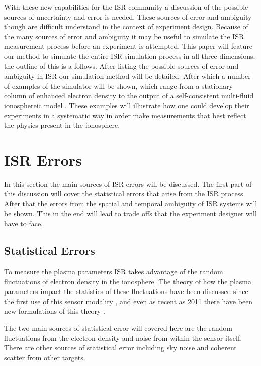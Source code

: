 \documentclass[draft,ras]{agutex}
\begin{document}
\begin{article}
With these new capabilities for the ISR community a discussion of the possible sources of uncertainty and error is needed. These sources of error and ambiguity though are difficult understand in the context of experiment design. Because of the many sources of error and ambiguity it may be useful to simulate the ISR measurement process before an experiment is attempted. This paper will feature our method to simulate the entire ISR simulation process in all three dimensions, the outline of this is a follows. After listing the possible sources of error and ambiguity in ISR our simulation method will be detailed. After which  a number of examples of the simulator will be shown, which range from a stationary column of enhanced electron density to the output of a self-consistent multi-fluid ionosphereic model \citep{semeter:plasmatransport2012}. These examples will illustrate how one could develop their experiments in a systematic way in order make measurements that best reflect the physics present in the ionosphere.
\section{ISR Errors}

In this section the main sources of ISR errors will be discussed. The first part of this discussion will cover the statistical errors that arise from the ISR process. After that the errors from the spatial and temporal ambiguity of ISR systems will be shown. This in the end will lead to trade offs that the experiment designer will have to face.

\subsection{Statistical Errors}

To measure the plasma parameters ISR takes advantage of the random fluctuations of electron density in the ionosphere. The theory of how the plasma parameters impact the statistics of these fluctuations have been discussed since the first use of this sensor modality \citep{gordon58,dougherty:farley1960, farleydougherty:ISR2, doughteryfarley:ISR3, hagfors1961}, and even as recent as 2011 there have been new formulations of this theory \citep{kudeki:milla:1,kudeki:milla:2}. 

The two main sources of statistical error will covered here are the random fluctuations from the electron density and noise from within the sensor itself. There are other sources of statistical error including sky noise and coherent scatter from other targets. 


\end{article}
\end{document}
